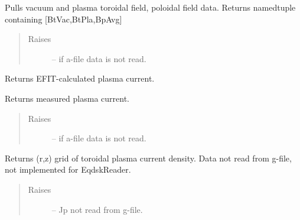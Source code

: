 \documentclass[letterpaper,10pt,english]{sphinxmanual}
\begin{document}
\begin{fulllineitems}
\begin{fulllineitems}
\begin{quote}
\begin{description}
\end{description}\end{quote}

\end{fulllineitems}


\begin{fulllineitems}
\label{eqtools:eqtools.eqdskreader.EqdskReader.getFields}
Pulls vacuum and plasma toroidal field, poloidal field data.
Returns namedtuple containing {[}BtVac,BtPla,BpAvg{]}
\begin{quote}\begin{description}
\item[{Raises }] \leavevmode
{} -- 
if a-file data is not read.

\end{description}\end{quote}

\end{fulllineitems}


\begin{fulllineitems}
\label{eqtools:eqtools.eqdskreader.EqdskReader.getIpCalc}
Returns EFIT-calculated plasma current.

\end{fulllineitems}


\begin{fulllineitems}
\label{eqtools:eqtools.eqdskreader.EqdskReader.getIpMeas}
Returns measured plasma current.
\begin{quote}\begin{description}
\item[{Raises }] \leavevmode
{} -- 
if a-file data is not read.

\end{description}\end{quote}

\end{fulllineitems}


\begin{fulllineitems}
\label{eqtools:eqtools.eqdskreader.EqdskReader.getJp}
Returns (r,z) grid of toroidal plasma current density.
Data not read from g-file, not implemented for EqdskReader.
\begin{quote}\begin{description}
\item[{Raises }] \leavevmode
{} -- 
Jp not read from g-file.


\end{description}
\end{quote}
\end{fulllineitems}
\end{fulllineitems}
\end{document}
